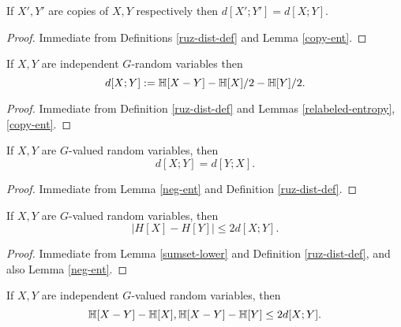 \begin{lemma}\label{ruz-copy}
  \leanok
  If $X',Y'$ are copies of $X,Y$ respectively then $d[X';Y']=d[X;Y]$.
\end{lemma}

\begin{proof} \leanok Immediate from Definitions \ref{ruz-dist-def} and Lemma \ref{copy-ent}.
\end{proof}

\begin{lemma}\label{ruz-indep}
  \leanok
  If $X,Y$ are independent $G$-random variables then
  $$ d[X;Y] := \mathbb{H}[X - Y] - \mathbb{H}[X]/2 - \mathbb{H}[Y]/2.$$
\end{lemma}

\begin{proof} \leanok Immediate from Definition \ref{ruz-dist-def} and Lemmas \ref{relabeled-entropy}, \ref{copy-ent}.
\end{proof}

\begin{lemma}\label{ruzsa-symm}
  \leanok
  If $X,Y$ are $G$-valued random variables, then
  $$ d[X;Y] = d[Y;X].$$
\end{lemma}

\begin{proof} \leanok Immediate from Lemma \ref{neg-ent} and Definition \ref{ruz-dist-def}.
\end{proof}

\begin{lemma}\label{ruzsa-diff}
  \leanok
  If $X,Y$ are $G$-valued random variables, then
$$|H[X]-H[Y]| \leq 2 d[X;Y].$$
\end{lemma}

\begin{proof}  \leanok Immediate from Lemma \ref{sumset-lower} and Definition \ref{ruz-dist-def}, and also Lemma \ref{neg-ent}.
\end{proof}

\begin{lemma}\label{ruzsa-growth}
  \leanok
  If $X,Y$ are independent $G$-valued random variables, then
$$  \mathbb{H}[X-Y] - \mathbb{H}[X], \mathbb{H}[X-Y] - \mathbb{H}[Y] \leq 2d[X;Y].$$
\end{lemma}

